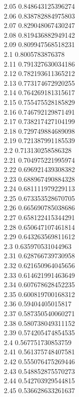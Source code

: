 {2.05	0.848643125396274\\
2.06	0.838782884975803\\
2.07	0.829048067430247\\
2.08	0.819436882949142\\
2.09	0.809947568518231\\
2.1	0.8005783876378\\
2.11	0.791327630034186\\
2.12	0.782193611365212\\
2.13	0.773174672920255\\
2.14	0.764269181315617\\
2.15	0.755475528185829\\
2.16	0.746792129871491\\
2.17	0.738217427104199\\
2.18	0.729749884689098\\
2.19	0.721387991185539\\
2.2	0.713130258586328\\
2.21	0.704975221995974\\
2.22	0.696921439308382\\
2.23	0.688967490884328\\
2.24	0.681111979229113\\
2.25	0.673353528670705\\
2.26	0.665690785038686\\
2.27	0.658122415344291\\
2.28	0.650647107461814\\
2.29	0.643263569811612\\
2.3	0.635970531044963\\
2.31	0.628766739730958\\
2.32	0.621650964045656\\
2.33	0.614621991463649\\
2.34	0.607678628452235\\
2.35	0.600819700168312\\
2.36	0.59404405015817\\
2.37	0.587350540060271\\
2.38	0.580738049311152\\
2.39	0.574205474854535\\
2.4	0.567751730853759\\
2.41	0.561375748407581\\
2.42	0.555076475269446\\
2.43	0.548852875570273\\
2.44	0.542703929544815\\
2.45	0.536628633261637\\
}
